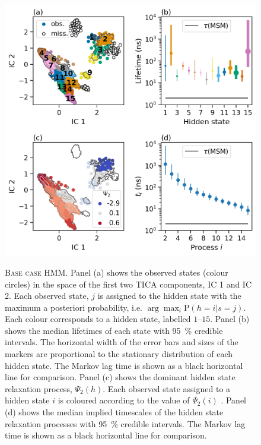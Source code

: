 \begin{figure}
    \centering
    \caption[Base case HMM]{\textsc{Base case HMM}. Panel (a) shows the observed states (colour circles) in the space of the first two TICA components, IC 1 and IC 2. Each observed state, $j$ is assigned to the hidden state with the maximum a posteriori probability, i.e.  $\arg \max_{i} \mathrm{P}(h=i|s=j)$. Each colour corresponds to a hidden state, labelled $\numrange[range-phrase=\text{--}]{1}{15}$. Panel (b) shows the median lifetimes of each state with \SI{95}{\percent} credible intervals. The horizontal width of the error bars and sizes of the markers are proportional to the stationary distribution of each hidden state. The Markov lag time is shown as a black horizontal line for comparison. Panel (c) shows the dominant hidden state relaxation process, $\Psi_{2}(h)$. Each observed state assigned to a hidden state $i$ is coloured according to the value of $\Psi_{2}(i)$ . Panel (d) shows the median implied timescales of the hidden state relaxation processes with \SI{95}{\percent} credible intervals. The Markov lag time is shown as a black horizontal line for comparison.}
    \includegraphics{chapters/aadh/figures/base_case_hmm.png}
    \label{fig:base_case_hmm}
\end{figure}

